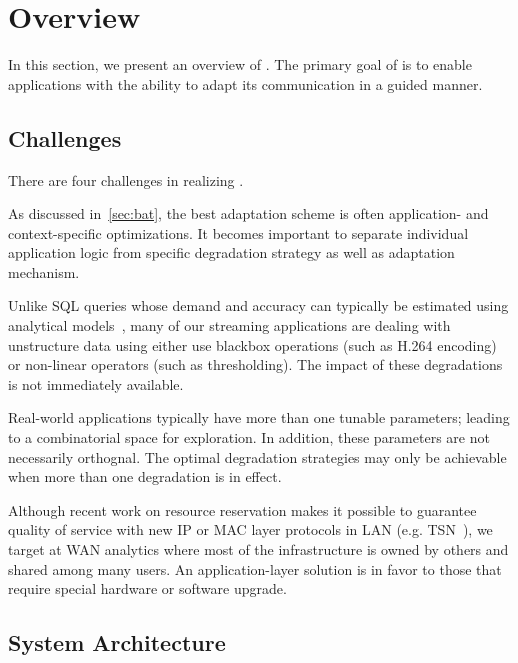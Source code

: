 \section{\sysname{} Overview}
\label{sec:system-overview}

In this section, we present an overview of \sysname{}. The primary goal of
\sysname{} is to enable applications with the ability to adapt its communication
in a guided manner.

\subsection{Challenges}
\label{sec:challenges}

\noindent There are four challenges in realizing \sysname{}.

 As discussed in~\autoref{sec:bat}, the
best adaptation scheme is often application- and context-specific
optimizations. It becomes important to separate individual application logic
from specific degradation strategy as well as adaptation mechanism.

 Unlike SQL queries whose demand and accuracy
can typically be estimated using analytical models~\cite{cormode2012synopses},
many of our streaming applications are dealing with unstructure data using
either use blackbox operations (such as H.264 encoding) or non-linear operators
(such as thresholding). The impact of these degradations is not immediately
available.

 Real-world applications typically have
more than one tunable parameters; leading to a combinatorial space for
exploration. In addition, these parameters are not necessarily orthognal.  The
optimal degradation strategies may only be achievable when more than one
degradation is in effect.

 Although recent work on
resource reservation makes it possible to guarantee quality of service with new
IP or MAC layer protocols in LAN (e.g. TSN~\cite{johas2013heterogeneous}), we
target at WAN analytics where most of the infrastructure is owned by others and
shared among many users. An application-layer solution is in favor to those that
require special hardware or software upgrade.

\subsection{System Architecture}
\label{sec:architecture}

